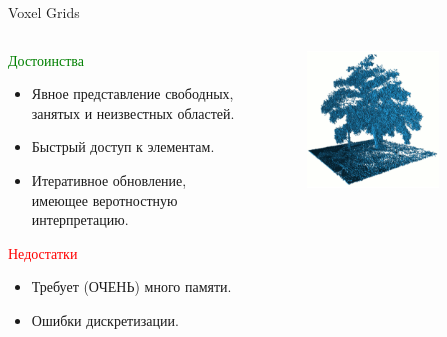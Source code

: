 \documentclass[9pt]{beamer}
\begin{document}
\begin{frame}{Voxel Grids}
\begin{columns}
\begin{column}{0.50\textwidth}
  \begin{block}{\textcolor{green}{Достоинства}}
    \begin{itemize}
    \item
    { 
      Явное представление свободных, занятых и неизвестных областей.
    }
    \item
    {
      Быстрый доступ к элементам.
    }
    \item
    {
      Итеративное обновление, имеющее веротностную интерпретацию.
    }
    \end{itemize}
  \end{block}

  \begin{block}{\textcolor{red}{Недостатки}}
    \begin{itemize}
    \item
    { 
      Требует (ОЧЕНЬ) много памяти.
    }
    \item
    {
      Ошибки дискретизации.
    }
    \end{itemize}
  \end{block}
\end{column}
\begin{column}{0.50\textwidth}
\begin{figure}[h]
    \centering
    \includegraphics[width=0.8\textwidth]{octomap_tree.png}
\end{figure}
\end{column}
\end{columns}
\end{frame}
\end{document}
